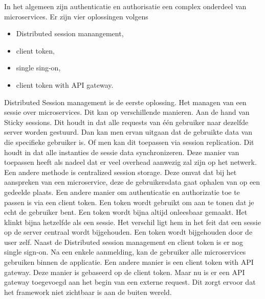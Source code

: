 In het algemeen zijn authenticatie en authorisatie een complex onderdeel van microservices.
Er zijn vier oplossingen volgens \textcite{Ayoub2018}
\begin{itemize}
	\item Distributed session manangement,
	\item client token,
	\item single sing-on, 
	\item client token with API gateway.
\end{itemize}
Distributed Session management is de eerste oplossing. Het managen van een sessie over microservices. Dit kan op verschillende manieren. Aan de hand van Sticky sessions. Dit houdt in dat alle requests van één gebruiker naar dezelfde server worden gestuurd. Dan kan men ervan uitgaan dat de gebruikte data van die specifieke gebruiker is. Of men kan dit toepassen via session replication. Dit houdt in dat alle instanties de sessie data synchronizeren. Deze manier van toepassen heeft als nadeel dat er veel overhead aanwezig zal zijn op het netwerk. Een andere methode is centralized session storage. Deze omvat dat bij het aanspreken van een microservice, deze de gebruikersdata gaat ophalen van op een gedeelde plaats. 
Een andere manier om authenticatie en authorizatie toe te passen is via een client token. Een token wordt gebruikt om aan te tonen dat je echt de gebruiker bent. Een token wordt bijna altijd onleesbaar gemaakt. Het klinkt bijna hetzelfde als een sessie. Het verschil ligt hem in het feit dat een sessie op de server centraal wordt bijgehouden. Een token wordt bijgehouden door de user zelf.
Naast de Distributed session management en client token is er nog single sign-on. Na een enkele aanmelding, kan de gebruiker alle microservices gebruiken binnen de applicatie. 
Een andere manier is een client token with API gateway. Deze manier is gebaseerd op de client token. Maar nu is er een API gateway toegevoegd aan het begin van een externe request. Dit zorgt ervoor dat het framework niet zichtbaar is aan de buiten wereld. 

